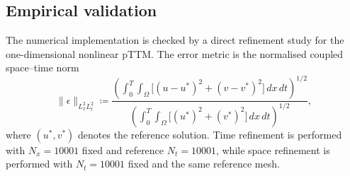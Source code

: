 \subsection{Empirical validation}
\label{sec:ch2-empirical-validation}

The numerical implementation is checked by a direct refinement study for the one-dimensional nonlinear pTTM. The error metric is the normalised coupled space--time norm
\[
    \|\epsilon\|_{L_x^2L_t^2}
    \coloneqq
    \frac{\left(\int_0^T \int_\Omega \bigl[(u-u^*)^2 + (v-v^*)^2\bigr] \, dx \, dt\right)^{1/2}}{\left(\int_0^T \int_\Omega \bigl[(u^*)^2 + (v^*)^2\bigr] \, dx \, dt\right)^{1/2}},
\]
where \((u^*,v^*)\) denotes the reference solution. Time refinement is performed with \(N_x=10001\) fixed and reference \(N_t=10001\), while space refinement is performed with \(N_t=10001\) fixed and the same reference mesh.

